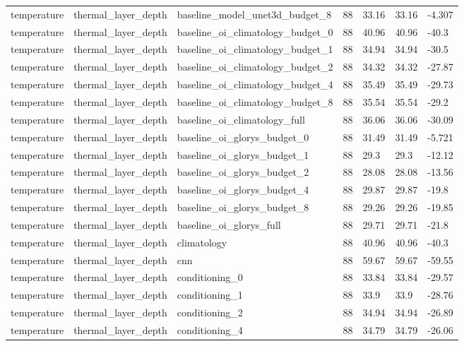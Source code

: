 \begin{table}[htbp]
\begin{tabular}{lllllll}
temperature & thermal\_layer\_depth & baseline\_model\_unet3d\_budget\_8 & 88 & 33.16 & 33.16 & -4.307 \\
temperature & thermal\_layer\_depth & baseline\_oi\_climatology\_budget\_0 & 88 & 40.96 & 40.96 & -40.3 \\
temperature & thermal\_layer\_depth & baseline\_oi\_climatology\_budget\_1 & 88 & 34.94 & 34.94 & -30.5 \\
temperature & thermal\_layer\_depth & baseline\_oi\_climatology\_budget\_2 & 88 & 34.32 & 34.32 & -27.87 \\
temperature & thermal\_layer\_depth & baseline\_oi\_climatology\_budget\_4 & 88 & 35.49 & 35.49 & -29.73 \\
temperature & thermal\_layer\_depth & baseline\_oi\_climatology\_budget\_8 & 88 & 35.54 & 35.54 & -29.2 \\
temperature & thermal\_layer\_depth & baseline\_oi\_climatology\_full & 88 & 36.06 & 36.06 & -30.09 \\
temperature & thermal\_layer\_depth & baseline\_oi\_glorys\_budget\_0 & 88 & 31.49 & 31.49 & -5.721 \\
temperature & thermal\_layer\_depth & baseline\_oi\_glorys\_budget\_1 & 88 & 29.3 & 29.3 & -12.12 \\
temperature & thermal\_layer\_depth & baseline\_oi\_glorys\_budget\_2 & 88 & 28.08 & 28.08 & -13.56 \\
temperature & thermal\_layer\_depth & baseline\_oi\_glorys\_budget\_4 & 88 & 29.87 & 29.87 & -19.8 \\
temperature & thermal\_layer\_depth & baseline\_oi\_glorys\_budget\_8 & 88 & 29.26 & 29.26 & -19.85 \\
temperature & thermal\_layer\_depth & baseline\_oi\_glorys\_full & 88 & 29.71 & 29.71 & -21.8 \\
temperature & thermal\_layer\_depth & climatology & 88 & 40.96 & 40.96 & -40.3 \\
temperature & thermal\_layer\_depth & cnn & 88 & 59.67 & 59.67 & -59.55 \\
temperature & thermal\_layer\_depth & conditioning\_0 & 88 & 33.84 & 33.84 & -29.57 \\
temperature & thermal\_layer\_depth & conditioning\_1 & 88 & 33.9 & 33.9 & -28.76 \\
temperature & thermal\_layer\_depth & conditioning\_2 & 88 & 34.94 & 34.94 & -26.89 \\
temperature & thermal\_layer\_depth & conditioning\_4 & 88 & 34.79 & 34.79 & -26.06 \\

\end{tabular}
\end{table}
